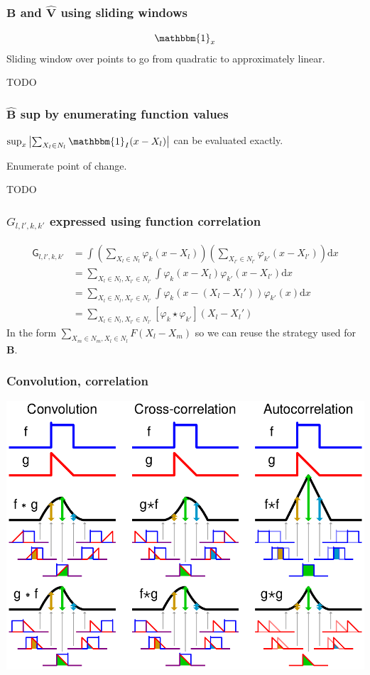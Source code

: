 \documentclass{beamer}
\newcommand\D{\mathrm{d}}
\newcommand\Correlation{\star}
\newcommand\Indicator[1]{\mathbbm{1}_{#1}}
\begin{document}
\begin{frame}\frametitle{$\bm{B}$ and $\widehat{\bm{V}}$ using sliding windows}
    \[ \Indicator{x} \]
    Sliding window over points to go from quadratic to approximately linear.

    TODO
\end{frame}

\begin{frame}\frametitle{$\widehat{\bm{B}}$ sup by enumerating function values}
    $\sup_x \left|\sum_{X_l \in N_l} \Indicator{I}(x - X_l) \right| $ can be evaluated exactly.

    Enumerate point of change.

    TODO
\end{frame}

\begin{frame}\frametitle{$G_{l,l',k,k'}$ expressed using function correlation}
    \[ \begin{split}
        \mathsf{G}_{l,l',k,k'}
        & = \int \left( \sum_{X_l \in N_l} \varphi_k(x-X_l) \right) \left( \sum_{X_{l'} \in N_{l'}} \varphi_{k'}(x-X_{l'}) \right) \D x \\
        & = \sum_{X_l \in N_l, X_{l'} \in N_{l'}} \int \varphi_k(x-X_l) \varphi_{k'}(x-X_{l'}) \D x \\
        & = \sum_{X_l \in N_l, X_{l'} \in N_{l'}} \int \varphi_k(x-(X_l-X_l')) \varphi_{k'}(x) \D x \\
        & = \sum_{X_l \in N_l, X_{l'} \in N_{l'}} [\varphi_k \Correlation \varphi_{k'}] (X_l-X_l')
    \end{split} \]
    In the form $\sum_{X_m \in N_m, X_l \in N_l} F(X_l - X_m)$ so we can reuse the strategy used for $\bm{B}$.
\end{frame}

\begin{frame}\frametitle{Convolution, correlation}
    \includegraphics[width=\textwidth]{wikipedia_convolution_correlation}
\end{frame}
\end{document}
